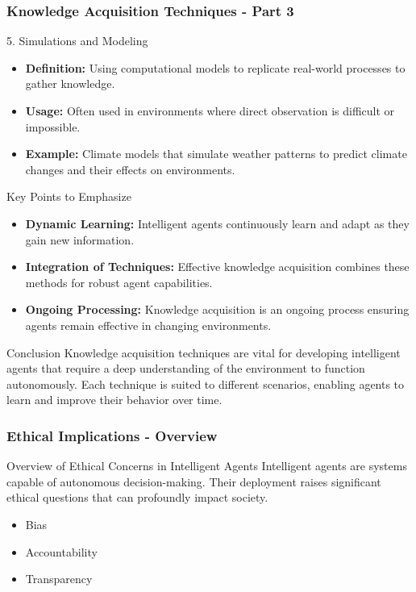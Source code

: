 \documentclass[aspectratio=169]{beamer}
\begin{document}
\begin{frame}[fragile]
    \frametitle{Knowledge Acquisition Techniques - Part 3}
    \begin{block}{5. Simulations and Modeling}
        \begin{itemize}
            \item \textbf{Definition:} Using computational models to replicate real-world processes to gather knowledge.
            \item \textbf{Usage:} Often used in environments where direct observation is difficult or impossible.
            \item \textbf{Example:} Climate models that simulate weather patterns to predict climate changes and their effects on environments.
        \end{itemize}
    \end{block}
    
    \begin{block}{Key Points to Emphasize}
        \begin{itemize}
            \item \textbf{Dynamic Learning:} Intelligent agents continuously learn and adapt as they gain new information.
            \item \textbf{Integration of Techniques:} Effective knowledge acquisition combines these methods for robust agent capabilities.
            \item \textbf{Ongoing Processing:} Knowledge acquisition is an ongoing process ensuring agents remain effective in changing environments.
        \end{itemize}
    \end{block}

    \begin{block}{Conclusion}
        Knowledge acquisition techniques are vital for developing intelligent agents that require a deep understanding of the environment to function autonomously. Each technique is suited to different scenarios, enabling agents to learn and improve their behavior over time.
    \end{block}
\end{frame}

\begin{frame}[fragile]
    \frametitle{Ethical Implications - Overview}
    \begin{block}{Overview of Ethical Concerns in Intelligent Agents}
        Intelligent agents are systems capable of autonomous decision-making. Their deployment raises significant ethical questions that can profoundly impact society. 
        \begin{itemize}
            \item Bias
            \item Accountability
            \item Transparency
        \end{itemize}
    \end{block}
\end{frame}
\end{document}
